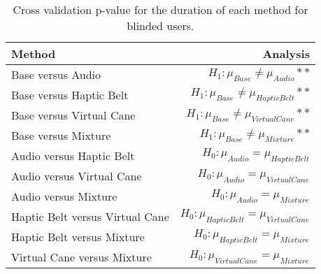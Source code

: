 
\begin{table}[!htb]
\centering
\caption{Cross validation p-value for the duration of each method for blinded users.}
\label{tab:lsd_duration_var}
\begin{tabular}{lr}
\toprule
                         Method &                                       Analysis \\
\midrule
              Base versus Audio &           $H_1 : \mu_{Base} \ne \mu_{Audio}**$ \\
        Base versus Haptic Belt &     $H_1 : \mu_{Base} \ne \mu_{Haptic Belt}**$ \\
       Base versus Virtual Cane &    $H_1 : \mu_{Base} \ne \mu_{Virtual Cane}**$ \\
            Base versus Mixture &         $H_1 : \mu_{Base} \ne \mu_{Mixture}**$ \\
       Audio versus Haptic Belt &        $H_0 : \mu_{Audio} = \mu_{Haptic Belt}$ \\
      Audio versus Virtual Cane &       $H_0 : \mu_{Audio} = \mu_{Virtual Cane}$ \\
           Audio versus Mixture &            $H_0 : \mu_{Audio} = \mu_{Mixture}$ \\
Haptic Belt versus Virtual Cane & $H_0 : \mu_{Haptic Belt} = \mu_{Virtual Cane}$ \\
     Haptic Belt versus Mixture &      $H_0 : \mu_{Haptic Belt} = \mu_{Mixture}$ \\
    Virtual Cane versus Mixture &     $H_0 : \mu_{Virtual Cane} = \mu_{Mixture}$ \\
\bottomrule
\end{tabular}
\end{table}

